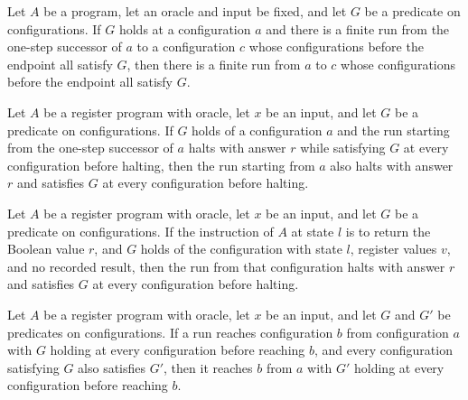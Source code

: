 \begin{lemma}
\label{Complexity.LogProg.AReach.step}
\leanok
{}
Let $A$ be a program, let an oracle and input be fixed, and let $G$ be a predicate on
configurations. If $G$ holds at a configuration $a$ and there is a finite run from the
one-step successor of $a$ to a configuration $c$ whose configurations before the
endpoint all satisfy $G$, then there is a finite run from $a$ to $c$ whose
configurations before the endpoint all satisfy $G$.
\end{lemma}

\begin{lemma}
\label{Complexity.LogProg.AHalt.step}
\leanok
{}
Let $A$ be a register program with oracle, let $x$ be an input, and let $G$ be a
predicate on configurations. If $G$ holds of a configuration $a$ and the run starting
from the one-step successor of $a$ halts with answer $r$ while satisfying $G$ at every
configuration before halting, then the run starting from $a$ also halts with answer $r$
and satisfies $G$ at every configuration before halting.
\end{lemma}

\begin{lemma}
\label{Complexity.LogProg.AHalt.ret}
\leanok
{}
Let $A$ be a register program with oracle, let $x$ be an input, and let $G$ be a
predicate on configurations. If the instruction of $A$ at state $l$ is to return the
Boolean value $r$, and $G$ holds of the configuration with state $l$, register values
$v$, and no recorded result, then the run from that configuration halts with answer $r$
and satisfies $G$ at every configuration before halting.
\end{lemma}

\begin{lemma}
\label{Complexity.LogProg.AReach.mono}
\leanok
{}
Let $A$ be a register program with oracle, let $x$ be an input, and let $G$ and $G'$ be
predicates on configurations. If a run reaches configuration $b$ from configuration $a$
with $G$ holding at every configuration before reaching $b$, and every configuration
satisfying $G$ also satisfies $G'$, then it reaches $b$ from $a$ with $G'$ holding at
every configuration before reaching $b$.
\end{lemma}

